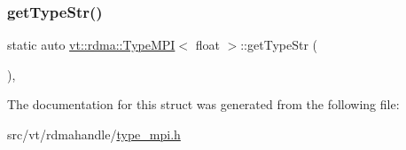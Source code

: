 \subsubsection{\texorpdfstring{get\+Type\+Str()}{getTypeStr()}}
{\footnotesize\ttfamily static auto \hyperlink{structvt_1_1rdma_1_1_type_m_p_i}{vt\+::rdma\+::\+Type\+M\+PI}$<$ float $>$\+::get\+Type\+Str (\begin{DoxyParamCaption}{ }\end{DoxyParamCaption})\hspace{0.3cm}{\ttfamily [inline]}, {\ttfamily [static]}}



The documentation for this struct was generated from the following file\+:\begin{DoxyCompactItemize}
\item 
src/vt/rdmahandle/\hyperlink{type__mpi_8h}{type\+\_\+mpi.\+h}\end{DoxyCompactItemize}
